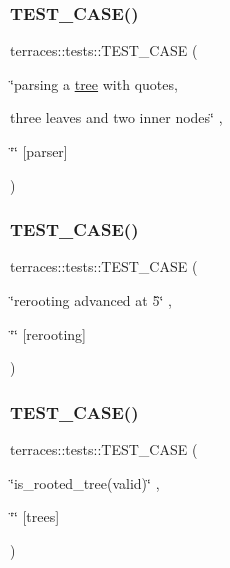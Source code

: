 \subsubsection{\texorpdfstring{T\+E\+S\+T\+\_\+\+C\+A\+S\+E()}{TEST\_CASE()}\hspace{0.1cm}{\footnotesize\ttfamily [54/78]}}
{\footnotesize\ttfamily terraces\+::tests\+::\+T\+E\+S\+T\+\_\+\+C\+A\+SE (\begin{DoxyParamCaption}\item[{\char`\"{}parsing a \hyperlink{namespaceterraces_a07aaf7feec4a22c6cdefc14c5a81bdd0}{tree} with}]{quotes,  }\item[{three leaves and two inner nodes\char`\"{}}]{,  }\item[{\char`\"{}\char`\"{}}]{\mbox{[}parser\mbox{]} }\end{DoxyParamCaption})}

\mbox{\label{namespaceterraces_1_1tests_aed7e05ed35b8fde80ae2b916cacbbfd4}} 
\subsubsection{\texorpdfstring{T\+E\+S\+T\+\_\+\+C\+A\+S\+E()}{TEST\_CASE()}\hspace{0.1cm}{\footnotesize\ttfamily [55/78]}}
{\footnotesize\ttfamily terraces\+::tests\+::\+T\+E\+S\+T\+\_\+\+C\+A\+SE (\begin{DoxyParamCaption}\item[{\char`\"{}rerooting advanced at 5\char`\"{}}]{,  }\item[{\char`\"{}\char`\"{}}]{\mbox{[}rerooting\mbox{]} }\end{DoxyParamCaption})}

\mbox{\label{namespaceterraces_1_1tests_a1dd6662b89a8e5a79af83ea67fa4f3cc}} 
\subsubsection{\texorpdfstring{T\+E\+S\+T\+\_\+\+C\+A\+S\+E()}{TEST\_CASE()}\hspace{0.1cm}{\footnotesize\ttfamily [56/78]}}
{\footnotesize\ttfamily terraces\+::tests\+::\+T\+E\+S\+T\+\_\+\+C\+A\+SE (\begin{DoxyParamCaption}\item[{\char`\"{}is\+\_\+rooted\+\_\+tree(valid)\char`\"{}}]{,  }\item[{\char`\"{}\char`\"{}}]{\mbox{[}trees\mbox{]} }\end{DoxyParamCaption})}

